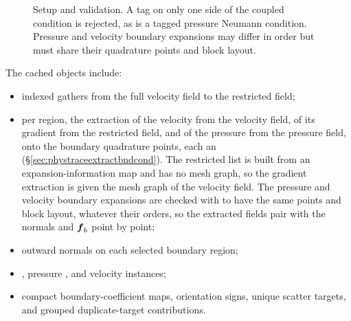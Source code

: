 \begin{figure}[htbp]
\centering
{}
\caption{Setup and validation.  A tag on only one side of the coupled
condition is rejected, as is a tagged pressure Neumann condition.  Pressure
and velocity boundary expansions may differ in order but must share their
quadrature points and block layout.}
\label{houtflow:fig:setup}
\end{figure}

The cached objects include:
\begin{itemize}
  \item indexed gathers from the full velocity field to the restricted field;
  \item per region, the extraction of the velocity from the velocity field,
        of its gradient from the restricted field, and of the pressure from
        the pressure field, onto the boundary quadrature points, each an
        (\S\ref{sec:phystraceextractbndcond}). The restricted list is built
        from an expansion-information map and has no mesh graph, so the
        gradient extraction is given the mesh graph of the velocity field.
        The pressure and velocity boundary expansions are checked with
         to have the same points and
        block layout, whatever their orders, so the extracted fields pair
        with the normals and $\boldsymbol{f}_b$ point by point;
  \item outward normals on each selected boundary region;
  \item {}, pressure , and velocity
         instances;
  \item compact boundary-coefficient maps, orientation signs, unique scatter
        targets, and grouped duplicate-target contributions.
\end{itemize}


